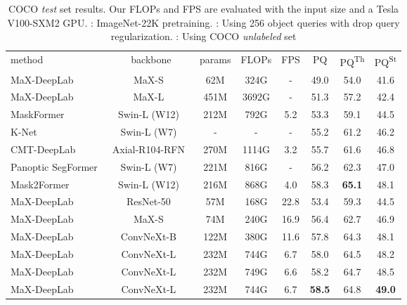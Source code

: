 \documentclass[runningheads]{llncs}
\newcommand{\tablestyle}[2]{\setlength{\tabcolsep}{#1}\renewcommand{\arraystretch}{#2}\centering\footnotesize}
\begin{document}
\begin{table*}[!t]
\centering
\small
\caption{COCO \textit{test} set results. Our FLOPs and FPS are evaluated with the input size  and a Tesla V100-SXM2 GPU. : ImageNet-22K pretraining. : Using 256 object queries with drop query regularization. : Using COCO \textit{unlabeled} set
}
\tablestyle{1pt}{0.9}
\begin{tabular}{l|c|ccc|ccc}
method & backbone & params & FLOPs & FPS & PQ  & PQ\textsuperscript{Th} & PQ\textsuperscript{St}\\
\shline
MaX-DeepLab~\cite{wang2021max} & MaX-S~\cite{wang2021max} & 62M & 324G & - & 49.0 & 54.0 & 41.6 \\
MaX-DeepLab~\cite{wang2021max} & MaX-L~\cite{wang2021max} & 451M & 3692G & - & 51.3  & 57.2 & 42.4 \\
MaskFormer~\cite{cheng2021per} & Swin-L (W12)~\cite{liu2021swin} & 212M & 792G & 5.2 & 53.3 & 59.1 & 44.5  \\
K-Net~\cite{zhang2021k} & Swin-L (W7)~\cite{liu2021swin} & - & - & - & 55.2  & 61.2 & 46.2 \\
CMT-DeepLab~\cite{yu2022cmt} & Axial-R104-RFN~\cite{qiao2021detectors} & 270M & 1114G & 3.2 & 55.7  & 61.6 & 46.8 \\
Panoptic SegFormer~\cite{li2021panoptic} & Swin-L (W7)~\cite{liu2021swin} & 221M & 816G & - & 56.2 & 62.3 & 47.0 \\
Mask2Former~\cite{cheng2021masked} & Swin-L (W12)~\cite{liu2021swin} & 216M & 868G & 4.0 & 58.3 & \textbf{65.1} & 48.1 \\
\hline \hline
MaX-DeepLab & ResNet-50~\cite{he2016deep} & 57M & 168G & 22.8 & 53.4 & 59.3 & 44.5 \\
MaX-DeepLab & MaX-S~\cite{wang2021max} & 74M & 240G & 16.9 & 56.4 & 62.7 & 46.9 \\
MaX-DeepLab & ConvNeXt-B~\cite{liu2022convnet} & 122M & 380G & 11.6 & 57.8 & 64.3 & 48.1 \\
MaX-DeepLab & ConvNeXt-L~\cite{liu2022convnet} & 232M & 744G & 6.7 & 58.0 & 64.5 & 48.2 \\
MaX-DeepLab &
ConvNeXt-L~\cite{liu2022convnet} & 232M & 749G & 6.6 & 58.2 & 64.7 & 48.5 \\
MaX-DeepLab &
ConvNeXt-L~\cite{liu2022convnet} & 232M & 744G & 6.7 & \textbf{58.5} & 64.8 & \textbf{49.0} \\
\end{tabular}
\label{tab:coco_test}
\end{table*}
\end{document}
